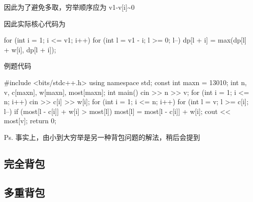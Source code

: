 因此为了避免多取，穷举顺序应为 v1-v[i]\textasciitilde{}0

因此实际核心代码为

\begin{cppcode}
for (int i = 1; i <= v1; i++)
  for (int l = v1 - i; l >= 0; l--) dp[l + i] = max(dp[l] + w[i], dp[l + i]);
\end{cppcode}

例题代码

\begin{cppcode}
#include <bits/stdc++.h>
using namespace std;
const int maxn = 13010;
int n, v, c[maxn], w[maxn], most[maxn];
int main() {
  cin >> n >> v;
  for (int i = 1; i <= n; i++) {
    cin >> c[i] >> w[i];
  }
  for (int i = 1; i <= n; i++)
    for (int l = v; l >= c[i]; l--) {
      if (most[l - c[i]] + w[i] > most[l]) most[l] = most[l - c[i]] + w[i];
    }
  cout << most[v];
  return 0;
}
\end{cppcode}

Ps. 事实上，由小到大穷举是另一种背包问题的解法，稍后会提到

\subsection{完全背包}

\subsection{多重背包}
